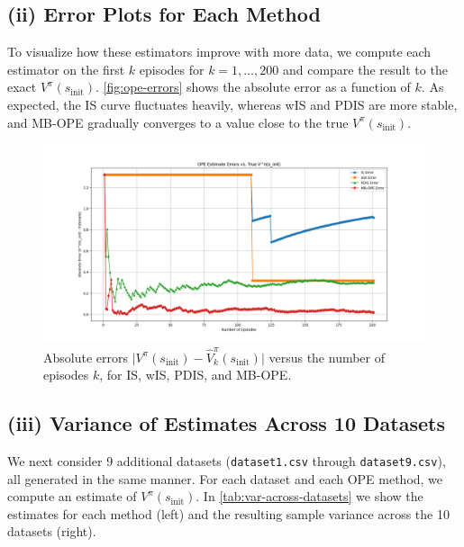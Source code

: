 \subsection*{(ii) Error Plots for Each Method}
To visualize how these estimators improve with more data, we compute each estimator on the first $k$ episodes for $k=1,\dots,200$ and compare the result to the exact $V^\pi(s_{\text{init}})$. \autoref{fig:ope-errors} shows the absolute error as a function of $k$. As expected, the IS curve fluctuates heavily, whereas wIS and PDIS are more stable, and MB-OPE gradually converges to a value close to the true $V^\pi(s_{\text{init}})$.

\begin{figure}[h!]
\centering
\includegraphics[width=0.7\linewidth]{Code/plots.png}
\caption{Absolute errors $\bigl|V^\pi(s_{\text{init}}) - \widehat{V}^\pi_k(s_{\text{init}})\bigr|$ versus the number of episodes $k$, for IS, wIS, PDIS, and MB-OPE.}
\label{fig:ope-errors}
\end{figure}

\subsection*{(iii) Variance of Estimates Across 10 Datasets}
We next consider 9 additional datasets (\texttt{dataset1.csv} through \texttt{dataset9.csv}), all generated in the same manner. For each dataset and each OPE method, we compute an estimate of $V^\pi(s_{\text{init}})$. In \autoref{tab:var-across-datasets} we show the estimates for each method (left) and the resulting sample variance across the 10 datasets (right).  

